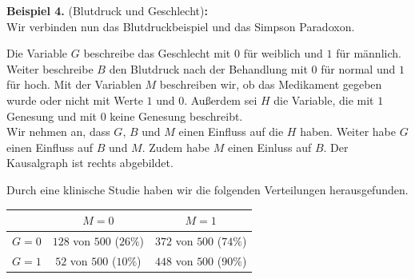 \documentclass[headsepline,11pt,bibliography=leveldown]{scrbook}
\newcounter{NewZaehler}
\newcommand{\NewZahl}{\refstepcounter{NewZaehler}4.\theNewZaehler}
\newenvironment{NewBeispiel}[1]{\par\medskip\textbf{Beispiel \NewZahl} #1\textbf{:}\\}{\par\medskip}
\begin{document}
\begin{NewBeispiel}{(Blutdruck und Geschlecht)}
Wir verbinden nun das Blutdruckbeispiel und das Simpson Paradoxon.\\

\begin{minipage}{0.5\linewidth}
Die Variable $G$ beschreibe das Geschlecht mit $0$ für weiblich und $1$ für männlich. Weiter beschreibe $B$ den Blutdruck nach der Behandlung mit $0$ für normal und $1$ für hoch. Mit der Variablen $M$ beschreiben wir, ob das Medikament gegeben wurde oder nicht mit Werte $1$ und $0$. Außerdem sei $H$ die Variable, die mit $1$ Genesung und mit $0$ keine Genesung beschreibt.\\

Wir nehmen an, dass $G$, $B$ und $M$ einen Einfluss auf die $H$ haben. Weiter habe $G$ einen Einfluss auf $B$ und $M$. Zudem habe $M$ einen Einluss auf $B$. Der Kausalgraph ist rechts abgebildet.\\
\end{minipage}
\begin{minipage}{0.5\linewidth}
\begin{center}
\end{center}
\end{minipage}

Durch eine klinische Studie haben wir die folgenden Verteilungen herausgefunden.
\begin{center}
\begin{tabular}{| c | c | c |}
\hline
& $M = 0$ & $M = 1$\\
\hline
$G = 0$ & $128$ von $500$ ($26 \%$) & $372$ von $500$ ($74 \%$)\\
\hline
$G = 1$ & $52$ von $500$ ($10 \%$) & $448$ von $500$ ($90 \%$)\\
\hline
\end{tabular}
\end{center}


\end{NewBeispiel}
\end{document}

